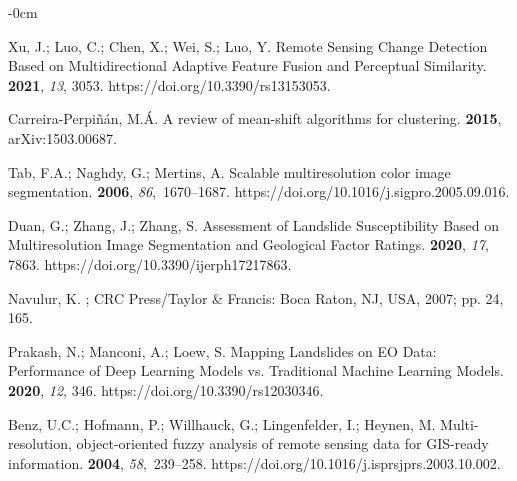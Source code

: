 \documentclass[remotesensing,article,accept,pdftex,moreauthors]{Definitions/mdpi}
\begin{document}
\begin{adjustwidth}{-\extralength}{0cm}
\begin{thebibliography}{999}
Xu, J.; Luo, C.; Chen, X.; Wei, S.; Luo, Y.
\newblock Remote Sensing Change Detection Based on Multidirectional Adaptive
  Feature Fusion and Perceptual Similarity.
 {\bf 2021}, {\em 13}, {3053.}
\newblock https://doi.org/10.3390/rs13153053.

Carreira{-}Perpi{\~{n}}{\'{a}}n, M.{\'{A}}.
\newblock A review of mean-shift algorithms for clustering.
 {\bf 2015}, arXiv:1503.00687. %

Tab, F.A.; Naghdy, G.; Mertins, A.
\newblock Scalable multiresolution color image segmentation.
 {\bf 2006}, {\em 86},~1670--1687.
\newblock https://doi.org/10.1016/j.sigpro.2005.09.016.

Duan, G.; Zhang, J.; Zhang, S.
\newblock Assessment of Landslide Susceptibility Based on Multiresolution Image
  Segmentation and Geological Factor Ratings.
 {\bf 2020}, {\em 17}, {7863}.
\newblock https://doi.org/10.3390/ijerph17217863.

Navulur, K.
; CRC Press/Taylor \& Francis: Boca Raton, NJ, USA, 2007; pp. 24, 165. %


Prakash, N.; Manconi, A.; Loew, S.
\newblock Mapping Landslides on EO Data: Performance of Deep Learning Models
  vs. Traditional Machine Learning Models.
 {\bf 2020}, {\em 12}, {346}.
\newblock https://doi.org/10.3390/rs12030346.

Benz, U.C.; Hofmann, P.; Willhauck, G.; Lingenfelder, I.; Heynen, M.
\newblock Multi-resolution, object-oriented fuzzy analysis of remote sensing
  data for GIS-ready information.
 {\bf 2004},
  {\em 58},~239--258. \linebreak https://doi.org/10.1016/j.isprsjprs.2003.10.002.


\end{thebibliography}
\end{adjustwidth}
\end{document}
